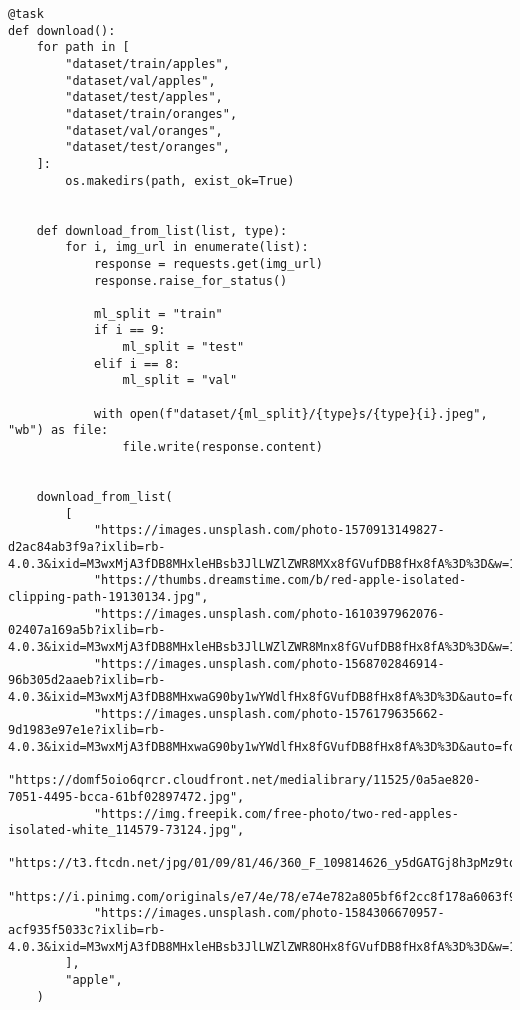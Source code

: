 \begin{verbatim}
@task
def download():
    for path in [
        "dataset/train/apples",
        "dataset/val/apples",
        "dataset/test/apples",
        "dataset/train/oranges",
        "dataset/val/oranges",
        "dataset/test/oranges",
    ]:
        os.makedirs(path, exist_ok=True)


    def download_from_list(list, type):
        for i, img_url in enumerate(list):
            response = requests.get(img_url)
            response.raise_for_status()

            ml_split = "train"
            if i == 9:
                ml_split = "test"
            elif i == 8:
                ml_split = "val"

            with open(f"dataset/{ml_split}/{type}s/{type}{i}.jpeg", "wb") as file:
                file.write(response.content)


    download_from_list(
        [
            "https://images.unsplash.com/photo-1570913149827-d2ac84ab3f9a?ixlib=rb-4.0.3&ixid=M3wxMjA3fDB8MHxleHBsb3JlLWZlZWR8MXx8fGVufDB8fHx8fA%3D%3D&w=1000&q=80",
            "https://thumbs.dreamstime.com/b/red-apple-isolated-clipping-path-19130134.jpg",
            "https://images.unsplash.com/photo-1610397962076-02407a169a5b?ixlib=rb-4.0.3&ixid=M3wxMjA3fDB8MHxleHBsb3JlLWZlZWR8Mnx8fGVufDB8fHx8fA%3D%3D&w=1000&q=80",
            "https://images.unsplash.com/photo-1568702846914-96b305d2aaeb?ixlib=rb-4.0.3&ixid=M3wxMjA3fDB8MHxwaG90by1wYWdlfHx8fGVufDB8fHx8fA%3D%3D&auto=format&fit=crop&w=2940&q=80",
            "https://images.unsplash.com/photo-1576179635662-9d1983e97e1e?ixlib=rb-4.0.3&ixid=M3wxMjA3fDB8MHxwaG90by1wYWdlfHx8fGVufDB8fHx8fA%3D%3D&auto=format&fit=crop&w=2787&q=80",
            "https://domf5oio6qrcr.cloudfront.net/medialibrary/11525/0a5ae820-7051-4495-bcca-61bf02897472.jpg",
            "https://img.freepik.com/free-photo/two-red-apples-isolated-white_114579-73124.jpg",
            "https://t3.ftcdn.net/jpg/01/09/81/46/360_F_109814626_y5dGATGj8h3pMz9tq1HNRfiuXR12uFCj.jpg",
            "https://i.pinimg.com/originals/e7/4e/78/e74e782a805bf6f2cc8f178a6063f9d7.jpg",
            "https://images.unsplash.com/photo-1584306670957-acf935f5033c?ixlib=rb-4.0.3&ixid=M3wxMjA3fDB8MHxleHBsb3JlLWZlZWR8OHx8fGVufDB8fHx8fA%3D%3D&w=1000&q=80",
        ],
        "apple",
    )


\end{verbatim}
